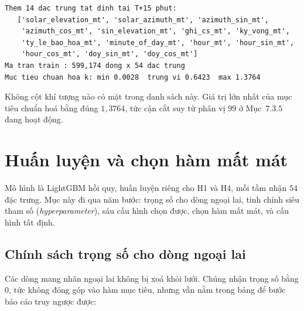 \documentclass[12pt, a4paper]{report}
\begin{document}
\begingroup
\par{}\vspace{8pt}
\small\renewcommand{\baselinestretch}{1.0}\selectfont
\begin{verbatim}
Them 14 dac trung tat dinh tai T+15 phut:
   ['solar_elevation_mt', 'solar_azimuth_mt', 'azimuth_sin_mt',
    'azimuth_cos_mt', 'sin_elevation_mt', 'ghi_cs_mt', 'ky_vong_mt',
    'ty_le_bao_hoa_mt', 'minute_of_day_mt', 'hour_mt', 'hour_sin_mt',
    'hour_cos_mt', 'doy_sin_mt', 'doy_cos_mt']
Ma tran train : 599,174 dong x 54 dac trung
Muc tieu chuan hoa k: min 0.0028  trung vi 0.6423  max 1.3764
\end{verbatim}
\par\vspace{8pt}
\endgroup
Không cột khí tượng nào có mặt trong danh sách này. Giá trị lớn nhất của mục tiêu chuẩn hoá
bằng đúng $1{,}3764$, tức cận cắt suy từ phân vị $99$ ở Mục~$7.3.5$ đang hoạt động.

\FloatBarrier
\section{Huấn luyện và chọn hàm mất mát}

Mô hình là LightGBM hồi quy, huấn luyện riêng cho H1 và H4, mỗi tầm nhận $54$ đặc trưng.
Mục này đi qua năm bước: trọng số cho dòng ngoại lai, tinh chỉnh siêu tham số
(\textit{hyperparameter}), sáu cấu hình chọn được, chọn hàm mất mát, và cấu hình tất định.

\FloatBarrier
\subsection{Chính sách trọng số cho dòng ngoại lai}

Các dòng mang nhãn ngoại lai không bị xoá khỏi lưới. Chúng nhận trọng số bằng $0$, tức không
đóng góp vào hàm mục tiêu, nhưng vẫn nằm trong bảng để bước báo cáo truy ngược được:
\end{document}
